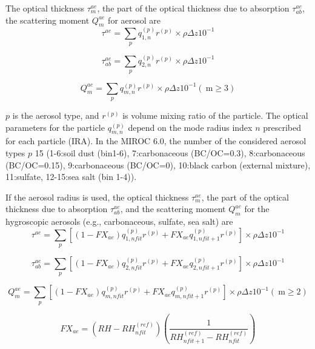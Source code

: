 The optical thickness \(\tau_{m}^{a e}\), the part of the optical
thickness due to absorption \(\tau_{ab}^{a e}\), the scattering moment
\(Q_{m}^{a e}\) for aerosol are \begin{equation}
\tau^{a e}=\sum_{p} q_{1, n}^{(p)} r^{(p)} \times \rho \Delta z 10^{-1}
\end{equation}

\begin{equation}
\tau_{ab}^{a e}=\sum_{p} q_{2, n}^{(p)} r^{(p)} \times \rho \Delta z 10^{-1}
\end{equation}

\begin{equation}
Q_{m}^{a e}=\sum_{p} q_{m, n}^{(p)} r^{(p)} \times \rho \Delta z 10^{-1} (\mathrm{~m} \geq 3)
\end{equation}

\(p\) is the aerosol type, and \(r^{(p)}\) is volume mixing ratio of the
particle. The optical parameters for the particle \(q_{m, n}^{(p)}\)
depend on the mode radius index \(n\) prescribed for each particle
(IRA). In the MIROC 6.0, the number of the considered aerosol types
\(p\) 15 (1-6:soil dust (bin1-6), 7:carbonaceous (BC/OC=0.3),
8:carbonaceous (BC/OC=0.15), 9:carbonaceous (BC/OC=0), 10:black carbon
(external mixture), 11:sulfate, 12-15:sea salt (bin 1-4)).

If the aerosol radius is used, the optical thickness \(\tau_{m}^{a e}\),
the part of the optical thickness due to absorption \(\tau_{ab}^{a e}\),
and the scattering moment \(Q_{m}^{a e}\) for the hygroscopic aerosols
(e.g., carbonaceous, sulfate, sea salt) are \begin{equation}
\tau^{a e}=\sum_{p}\left[\left(1-F X_{a e}\right) q_{1, n f i t}^{(p)} r^{(p)}+F X_{a e} q_{1, n f i t+1}^{(p)} r^{(p)}\right] \times \rho \Delta z 10^{-1}
\end{equation}

\begin{equation}
\tau_{ab}^{a e}=\sum_{p}\left[\left(1-F X_{a e}\right) q_{2, n f i t}^{(p)} r^{(p)}+F X_{a e} q_{2, n f i t+1}^{(p)} r^{(p)}\right] \times \rho \Delta z 10^{-1}
\end{equation}

\begin{equation}
Q_{m}^{a e}=\sum_{p}\left[\left(1-F X_{a e}\right) q_{m, n f i t}^{(p)} r^{(p)}+F X_{a e} q_{m, n f i t+1}^{(p)} r^{(p)}\right] \times \rho \Delta z 10^{-1}(\mathrm{~m} \geq 2)
\end{equation}

\begin{equation}
F X_{a e}=\left(R H-R H_{n f i t}^{(r e f)}\right)\left(\frac{1}{R H_{n f i t+1}^{(r e f)}-R H_{n f i t}^{(r e f)}}\right)
\end{equation}

